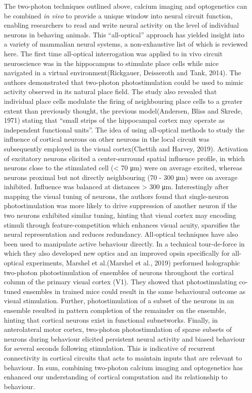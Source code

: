 The two-photon techniques outlined above, calcium imaging and optogenetics can be combined \textit{in vivo} to provide a unique window into neural circuit function, enabling researchers to read and write neural activity on the level of individual neurons in behaving animals. This “all-optical” approach has yielded insight into a variety of mammalian neural systems, a non-exhaustive list of which is reviewed here. The first time all-optical interrogation was applied to in vivo circuit neuroscience was in the hippocampus to stimulate place cells while mice navigated in a virtual environment(Rickgauer, Deisseroth and Tank, 2014). The authors demonstrated that two-photon photostimulation could be used to mimic activity observed in its natural place field. The study also revealed that individual place cells modulate the firing of neighbouring place cells to a greater extent than previously thought, the previous model(Andersen, Bliss and Skrede, 1971) stating that “small strips of the hippocampal cortex may operate as independent functional units”. The idea of using all-optical methods to study the influence of cortical neurons on other neurons in the local circuit was subsequently employed in the visual cortex(Chettih and Harvey, 2019). Activation of excitatory neurons elicited a center-surround spatial influence profile, in which neurons close to the stimulated cell (< 70 μm) were on average excited, whereas neurons proximal but not directly neighbouring (70 - 300 μm) were on average inhibited. Influence was balanced at distances > 300 μm. Interestingly after mapping the visual tuning of neurons, the authors found that single-neuron photostimulation was more likely to drive suppression of another neuron if the two neurons exhibited similar tuning, hinting that visual cortex may encoding stimuli through feature-competition which enhances visual acuity, sparsifies the neural representation and reduces redundancy.  All-optical techniques have also been used to manipulate active behaviour directly. In a technical tour-de-force in which they also developed new optics and an improved opsin specifically for all-optical experiments, Marshel et al.(Marshel et al., 2019) performed holographic two-photon photostimulation of ensembles of neurons throughout the cortical column of the primary visual cortex (V1). They showed that photostimulating co-tuned ensembles in trained mice could result in the same behavioural outcome as visual stimulation. Further, photostimulation of a subset of the neurons in an ensemble resulted in pattern completion of the remainder on the ensemble, hinting that cortical neurons exist in functional subnetworks. Finally, in anterolateral motor cortex, two-photon photostimulation of sparse subsets of neurons during behaviour elicited persistent neural activity and biased behaviour for several seconds following stimulation. This is indicative of recurrent connectivity in cortical circuits that acts to maintain inputs that are relevant to behaviour. In sum, combining two-photon calcium imaging and optogenetics has enhanced our understanding of cortical computation and its relationship to behaviour. 

